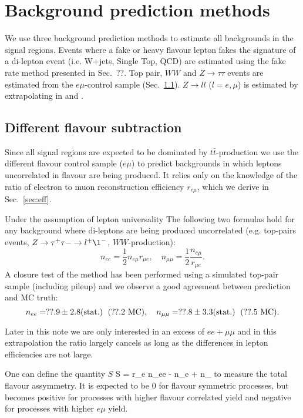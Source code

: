 \section{Background prediction methods}

We use three background prediction methods to
estimate all backgrounds in the signal regions.
Events where a fake or heavy flavour lepton
fakes the signature of a di-lepton event (i.e. W+jets, Single Top,
QCD) are estimated using the fake rate method 
presented in Sec.~??.
Top pair, $WW$ and $Z \rightarrow \tau \tau$ events
are estimated from the $e\mu$-control sample (Sec.~\ref{sec:ofossubtraction}).
$Z\rightarrow ll$ ($l=e,\mu$) is estimated by
extrapolating in \HT and \MET.

\subsection{Different flavour subtraction} \label{sec:ofossubtraction}
Since all signal regions are expected to be  
dominated by $t\bar{t}$-production we use
the different flavour control sample ($e\mu$) to predict
backgrounds in which leptons uncorrelated in flavour are being produced.
It relies only on the knowledge of the ratio
of electron to muon reconstruction efficiency $r_{e\mu}$,
which we derive in Sec.~\ref{sec:eff}.

Under the assumption of lepton universality
The following two formulas hold for any background
where di-leptons are being produced uncorrelated 
(e.g. top-pairs events, $Z \rightarrow \tau^{+} \tau{-} \rightarrow 
l^{+} \l^-$, $WW$-production):
$$
n_{ee} = \frac12n_{e\mu}r_{\mu{}e}, \quad n_{\mu\mu} = \frac12\frac{n_{e\mu}}{r_{\mu{}e}}.
$$
A closure test of the method has been performed
using a simulated top-pair sample (including pileup) and
we observe a good agreement between prediction and MC truth:
$$
n_{ee} = ??.9 \pm 2.8 (\textnormal{stat.}) \; \textnormal{ (??.2 MC)}, 
\quad n_{\mu\mu} = ??.8 \pm 3.3 (\textnormal{stat.}) \; \textnormal{ (??.5 MC)}.
$$

Later in this note we are only interested
in an excess of $ee+\mu\mu$ and in this
extrapolation the ratio largely cancels
as long as the differences in lepton efficiencies are not
large.

One can define the quantity $S$
\be
    S = r_{\mu e} n_{ee} - n_{e\mu} +  n_{\mu\mu}
\ee
to measure the total flavour assymmetry. It is expected
to be 0 for flavour symmetric processes,
but becomes positive for processes with higher
flavour correlated yield and negative for
processes with higher $e\mu$ yield.


